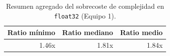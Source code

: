 \begin{table}[htbp]
\centering
\renewcommand{\arraystretch}{1.2}
\setlength{\tabcolsep}{8pt}
\begin{tabular}{|r|r|r|}
\hline
\rowcolor[gray]{0.90}
\textbf{Ratio mínimo} & \textbf{Ratio mediano} & \textbf{Ratio medio} \\
\hline
1.46x & 1.81x & 1.84x \\
\hline
\end{tabular}
\caption{Resumen agregado del sobrecoste de complejidad en \texttt{float32} (Equipo 1).}
\label{tab:complexity_summary_equipo1_float32}
\end{table}
